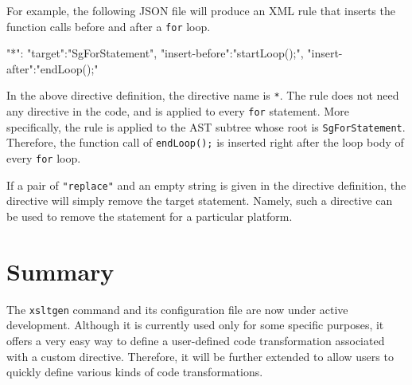 For example, the following JSON file will produce an XML rule that
inserts the function calls before and after a \texttt{for} loop.
\begin{framed}
\begin{src}
{
  "*":{
    "target":"SgForStatement",
    "insert-before":"startLoop();",
    "insert-after":"endLoop();"
  }
}
\end{src}
\end{framed}
In the above directive definition, the directive name is \texttt{*}. The
rule does not need any directive in the code, and is applied to every
\texttt{for} statement. More specifically, the rule is applied to the
AST subtree whose root is \texttt{SgForStatement}. Therefore, the
function call of \texttt{endLoop();} is inserted right after the loop
body of every \texttt{for} loop.

If a pair of \texttt{"replace"} and an empty string is given in the
directive definition, the directive will simply remove the target
statement. Namely, such a directive can be used to remove the statement
for a particular platform.


\section{Summary}
The \texttt{xsltgen} command and its configuration file are now under
active development. Although it is currently used only for some specific
purposes, it offers a very easy way to define a user-defined code
transformation associated with a custom directive. Therefore, it will be
further extended to allow users to quickly define various kinds of code
transformations.
